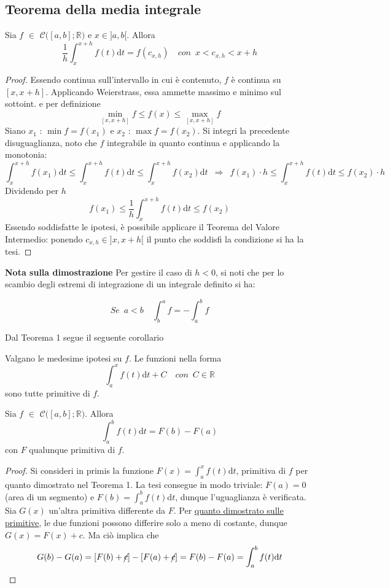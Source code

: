 \documentclass[10pt, oneside]{book}
\theoremstyle{plain}
\begin{document}
\subsection{Teorema della media integrale}
\begin{ther}[della m.i.]
    Sia $f$ $\in$ $\mathcal{C}\big([a,b] ; \mathbb{R}\big)$ e $x \in ]a,b[$. Allora
    \[\frac{1}{h}\int_x^{x+h}f(t)\textrm{d}t = f(c_{x,h}) \quad con \enspace x < c_{x,h} < x+h\]
\end{ther}
\begin{proof}
    Essendo continua sull'intervallo in cui è contenuto, $f$ è continua su $[x, x+h]$. Applicando Weierstrass, essa ammette massimo e minimo sul sottoint. e per definizione
    \[\min\limits_{[x, x+h]} f \leq f(x) \leq \max\limits_{[x, x+h]} f\]
    Siano $x_1$ : $\min f = f(x_1)$ e $x_2$ : $\max f = f(x_2)$. Si integri la precedente disuguaglianza, noto che $f$ integrabile in quanto continua e applicando la monotonia:
    \[\int_x^{x+h} f(x_1)\textrm{d}t\leq \int_x^{x+h} f(t)\textrm{d}t \leq \int_x^{x+h} f(x_2)\textrm{d}t \enspace \Rightarrow \enspace f(x_1) \cdot h \leq \int_x^{x+h} f(t)\textrm{d}t \leq f(x_2) \cdot h\]
    Dividendo per $h$
    \[f(x_1) \leq \frac{1}{h} \int_x^{x+h} f(t)\textrm{d}t \leq f(x_2)\]
    Essendo soddisfatte le ipotesi, è possibile applicare il Teorema del Valore Intermedio: ponendo $c_{x,h} \in ]x, x+h[$ il punto che soddisfi la condizione si ha la tesi.
\end{proof}
\textbf{Nota sulla dimostrazione} Per gestire il caso di $h < 0$, si noti che per lo scambio degli estremi di integrazione di un integrale definito si ha:

\begin{oss}
    \[Se \enspace a < b \quad \int_b^a f = - \int_a^b f\]
\end{oss}

Dal Teorema 1 segue il seguente corollario
\begin{cor}
    Valgano le medesime ipotesi su $f$. Le funzioni nella forma 
    \[\int_a^x f(t)\textrm{d}t + C \quad con \enspace C \in \mathbb{R}\]
    sono tutte primitive di $f$.
\end{cor}

\begin{ther}
    Sia $f$ $\in$ $\mathcal{C}\big([a,b] ; \mathbb{R}\big)$. Allora
    \[\int_a^b f(t)\textrm{d}t = F(b) - F(a)\]
    con $F$ qualunque primitiva di $f$.
\end{ther}
\begin{proof}
    Si consideri in primis la funzione $F(x) = \int_a^x f(t)\textrm{d}t$, primitiva di $f$ per quanto dimostrato nel Teorema 1. La tesi consegue in modo triviale: $F(a) = 0$ (area di un segmento) e $F(b) = \int_a^b f(t)\textrm{d}t$, dunque l'uguaglianza è verificata.
    \\Sia $G(x)$ un'altra primitiva differente da $F$. Per \hyperlink{primitive}{quanto dimostrato sulle primitive}, le due funzioni possono differire solo a meno di costante, dunque $G(x) = F(x) + c$. Ma ciò implica che
    \[G(b) - G(a) = [F(b) + \cancel{c}] - [F(a) + \cancel{c}] = F(b) - F(a) = \int_a^b f(t)\textrm{d}t\]
\end{proof}
\end{document}
